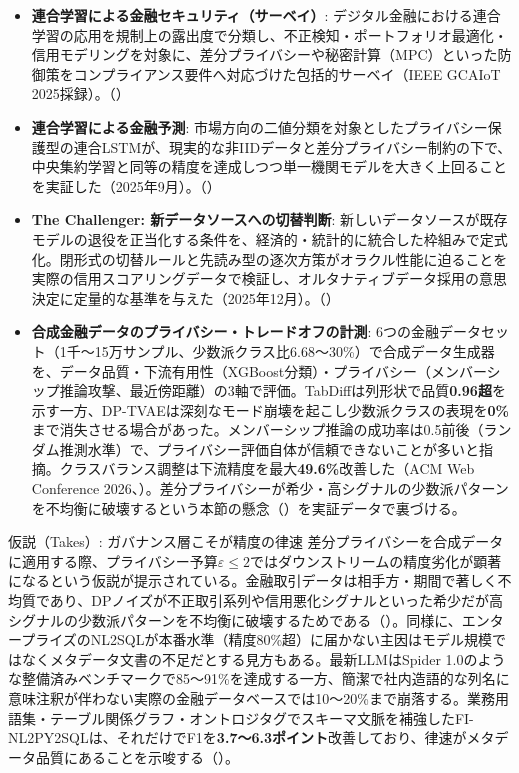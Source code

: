 \begin{itemize}
  \item \textbf{連合学習による金融セキュリティ（サーベイ）}: デジタル金融における連合学習の応用を規制上の露出度で分類し、不正検知・ポートフォリオ最適化・信用モデリングを対象に、差分プライバシーや秘密計算（MPC）といった防御策をコンプライアンス要件へ対応づけた包括的サーベイ（IEEE GCAIoT 2025採録）。（\cite{federatedlearning2025}）
  \item \textbf{連合学習による金融予測}: 市場方向の二値分類を対象としたプライバシー保護型の連合LSTMが、現実的な非IIDデータと差分プライバシー制約の下で、中央集約学習と同等の精度を達成しつつ単一機関モデルを大きく上回ることを実証した（2025年9月）。（\cite{fedforecasting2025}）
  \item \textbf{The Challenger: 新データソースへの切替判断}: 新しいデータソースが既存モデルの退役を正当化する条件を、経済的・統計的に統合した枠組みで定式化。閉形式の切替ルールと先読み型の逐次方策がオラクル性能に迫ることを実際の信用スコアリングデータで検証し、オルタナティブデータ採用の意思決定に定量的な基準を与えた（2025年12月）。（\cite{challenger2025}）
  \item \textbf{合成金融データのプライバシー・トレードオフの計測}: 6つの金融データセット（1千〜15万サンプル、少数派クラス比6.68〜30\%）で合成データ生成器を、データ品質・下流有用性（XGBoost分類）・プライバシー（メンバーシップ推論攻撃、最近傍距離）の3軸で評価。TabDiffは列形状で品質\textbf{0.96超}を示す一方、DP-TVAEは深刻なモード崩壊を起こし少数派クラスの表現を\textbf{0\%}まで消失させる場合があった。メンバーシップ推論の成功率は0.5前後（ランダム推測水準）で、プライバシー評価自体が信頼できないことが多いと指摘。クラスバランス調整は下流精度を最大\textbf{49.6\%}改善した（ACM Web Conference 2026、\cite{x02synthprivacy2026}）。差分プライバシーが希少・高シグナルの少数派パターンを不均衡に破壊するという本節の懸念（\cite{dpsynthetic2026}）を実証データで裏づける。
\end{itemize}

\begin{insight}{仮説（Takes）: ガバナンス層こそが精度の律速}
差分プライバシーを合成データに適用する際、プライバシー予算$\varepsilon \le 2$ではダウンストリームの精度劣化が顕著になるという仮説が提示されている。金融取引データは相手方・期間で著しく不均質であり、DPノイズが不正取引系列や信用悪化シグナルといった希少だが高シグナルの少数派パターンを不均衡に破壊するためである（\cite{dpsynthetic2026}）。同様に、エンタープライズのNL2SQLが本番水準（精度80\%超）に届かない主因はモデル規模ではなくメタデータ文書の不足だとする見方もある。最新LLMはSpider 1.0のような整備済みベンチマークで85〜91\%を達成する一方、簡潔で社内造語的な列名に意味注釈が伴わない実際の金融データベースでは10〜20\%まで崩落する。業務用語集・テーブル関係グラフ・オントロジタグでスキーマ文脈を補強したFI-NL2PY2SQLは、それだけでF1を\textbf{3.7〜6.3ポイント}改善しており、律速がメタデータ品質にあることを示唆する（\cite{nl2sqlmetadata2025}）。
\end{insight}

